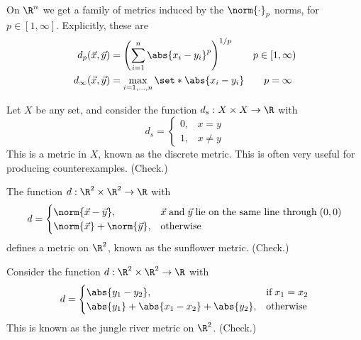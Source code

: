 \begin{negg}
  On $\R^n$ we get a family of metrics induced by the $\norm{\cdot}_p$ norms, for $p\in[1,\infty]$. Explicitly, these are
  \begin{align*}
    d_{p}(\vec{x}, \vec{y}) &= \left(\sum_{i=1}^{n} \abs{x_i - y_i}^{p}\right)^{1/p} \qquad p \in [1,\infty)\\
    d_{\infty}(\vec{x}, \vec{y}) &= \max_{i=1,\dots,n} \set*{\abs{x_i - y_i}} \qquad p = \infty
  \end{align*}
\end{negg}

\begin{negg}
  Let $X$ be any set, and consider the function $d_s:X \times X \to \R$ with
  \begin{equation*}
  d_s = \begin{cases}
  0, & x=y\\
  1, & x \neq y
  \end{cases}
  \end{equation*}
  This is a metric in $X$, known as the discrete metric. This is often very useful for producing counterexamples. (Check.)\eggqed
\end{negg}

\begin{negg}
  The function $d:\R^2 \times \R^2 \to \R$ with
  \begin{equation*}
  d = \begin{cases}
  \norm{\vec{x}-\vec{y}}, & \vec{x}\;\text{and}\;\vec{y}\;\text{lie on the same line through}\;(0,0)\\
  \norm{\vec{x}}+\norm{\vec{y}}, & \text{otherwise}
  \end{cases}
  \end{equation*}
  defines a metric on $\R^2$, known as the sunflower metric. (Check.)\eggqed
\end{negg}

\begin{negg}
  Consider the function $d:\R^2 \times \R^2 \to \R$ with
  \begin{equation*}
  d = \begin{cases}
  \abs{y_1 - y_2}, & \text{if}\;x_1 = x_2\\
  \abs{y_1} + \abs{x_1 - x_2} + \abs{y_2}, & \text{otherwise}
  \end{cases}
  \end{equation*}
  This is known as the jungle river metric on $\R^2$. (Check.)\eggqed
\end{negg}

